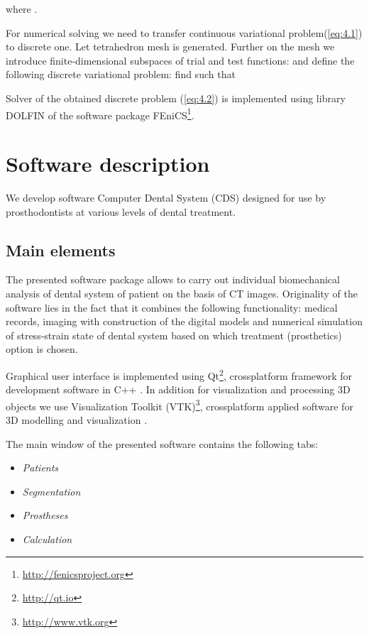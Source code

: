 \documentclass{elsarticle}
\begin{document}
where .

For numerical solving we need to transfer continuous variational
problem(\ref{eq:4.1}) to discrete one. Let tetrahedron mesh 
is generated.  Further on the mesh  we introduce
\cite{Hughes2012} finite-dimensional subspaces of trial and test
functions:  and define the following
discrete variational problem: find  such
that

Solver of the obtained discrete problem (\ref{eq:4.2}) is implemented
using library \textsf{DOLFIN} \cite{LoggWellsEtAl2012a} of the
software package \textsf{FEniCS}\footnote{\url{http://fenicsproject.org}}.

\section{Software description}

We develop software \textsf{Computer Dental System} (\textsf{CDS})
designed for use by prosthodontists at various levels of dental
treatment.

\subsection{Main elements} 

The presented software package allows to carry out individual
biomechanical analysis of dental system of patient on the basis of CT
images. Originality of the software lies in the fact that it combines
the following functionality: medical records, imaging with
construction of the digital models and numerical simulation of
stress-strain state of dental system based on which treatment
(prosthetics) option is chosen.

Graphical user interface is implemented using
\textsf{Qt}\footnote{\url{http://qt.io}}, crossplatform framework for
development software in \textsf{C++}
\cite{book:246597,summerfield2011advanced}. In addition for
visualization and processing 3D objects we use \textsf{Visualization Toolkit}
\textsf{(VTK})\footnote{\url{http://www.vtk.org}}, crossplatform
applied software for 3D modelling and visualization \cite{VTKbook2006}.

The main window of the presented software contains the following tabs:
\begin{itemize}
\item \emph{Patients}
\item \emph{Segmentation}
\item \emph{Prostheses}
\item \emph{Calculation}
\end{itemize}
\end{document}
